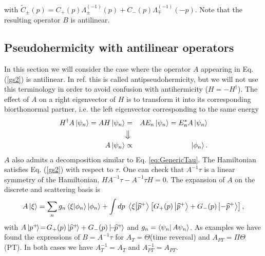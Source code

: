 %
with $\tilde{C}_\pm(p) = C_+(p)\Lambda_\pm^{(-1)}(p)+C_-(p)\Lambda_\mp^{(-1)}(-p)$. Note that the resulting operator $B$ is antilinear.

\subsection{Pseudohermicity with antilinear operators}

In this section we will consider the case where the operator $A$ appearing in Eq. (\ref{gs2}) is antilinear.  In ref. \cite{Mostafazadeh2002b} this is called antipseudohermicity, but we will not use this terminology in order to avoid confusion with antihermicity ($H = - H^\dagger$). The effect of $A$ on a right eigenvector of $H$ is to transform it  into its corresponding biorthonormal partner, i.e. the left eigenvector corresponding to the same energy
%
\begin{eqnarray}
    H^\dagger A \ket{\psi_n} = A H \ket{\psi_n}
    &=&A E_n\ket{\psi_n}
    = E_n^* A \ket{\psi_n}\nonumber\\
    &\big\Downarrow&\nonumber\\
    A\ket{\psi_n}&\propto&\ket{\phi_n}.
\end{eqnarray}
%
$A$ also admits a decomposition similar to Eq. \eqref{eq:GenericTau}.
The Hamiltonian satisfies Eq. (\ref{gs2})
with respect to $\tau$. One can check that $A^{-1}\tau$ is a linear symmetry of the Hamiltonian,
$HA^{-1}\tau - A^{-1}\tau H=0$. The expansion of $A$ on the discrete and scattering basis is
%
\begin{equation}
    A \ket{\xi} = \sum_n g_n \braket{\xi}{\phi_n} \ket{\phi_n} + \int dp \;  \braket{\xi}{\widehat{p}^+}   \left[ G_+(p) \ket{\widehat{p}^+} + G_-(p)\ket{-\widehat{p}^+} \right],
\end{equation}
%
with $A\ket{p^+\!}\!=\!G_+(p)\ket{\widehat{p}^+\!}+G_-(p)\ket{\!-\!\widehat{p}^+\!}$ and  $g_n = \bra{\psi_n}A {\psi_n}\rangle$.
As examples we have found the expressions of $B = A^{-1}\tau$ for $A_T = \Theta$(time reversal) and $A_{PT} = \Pi\Theta$ (PT). In both cases we have $A_T^{-1}=A_T$ and $A_{PT}^{-1}=A_{PT}$.
%
